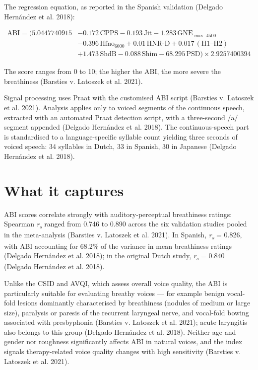 \documentclass[
  english,
  letterpaper,
]{scrbook}
\begin{document}
The regression equation, as reported in the Spanish validation (Delgado
Hernández et al. 2018):

\[
\begin{aligned}
\text{ABI} = \bigl(5.0447740915 &- 0.172\,\text{CPPS} - 0.193\,\text{Jit}
- 1.283\,\text{GNE}_{\max\text{-}4500}\\
&- 0.396\,\text{Hfno}_{6000} + 0.01\,\text{HNR-D} + 0.017\,(\text{H1–H2})\\
&+ 1.473\,\text{ShdB} - 0.088\,\text{Shim}
- 68.295\,\text{PSD}\bigr) \times 2.9257400394
\end{aligned}
\]

The score ranges from 0 to 10; the higher the ABI, the more severe the
breathiness (Barsties v. Latoszek et al. 2021).

Signal processing uses Praat with the customised ABI script (Barsties v.
Latoszek et al. 2021). Analysis applies only to voiced segments of the
continuous speech, extracted with an automated Praat detection script,
with a three-second /a/ segment appended (Delgado Hernández et al.
2018). The continuous-speech part is standardised to a language-specific
syllable count yielding three seconds of voiced speech: 34 syllables in
Dutch, 33 in Spanish, 30 in Japanese (Delgado Hernández et al. 2018).

\section{What it captures}\label{what-it-captures-2}

ABI scores correlate strongly with auditory-perceptual breathiness
ratings: Spearman \emph{r\textsubscript{s}} ranged from 0.746 to 0.890
across the six validation studies pooled in the meta-analysis (Barsties
v. Latoszek et al. 2021). In Spanish, \emph{r\textsubscript{s}} = 0.826,
with ABI accounting for 68.2\% of the variance in mean breathiness
ratings (Delgado Hernández et al. 2018); in the original Dutch study,
\emph{r\textsubscript{s}} = 0.840 (Delgado Hernández et al. 2018).

Unlike the CSID and AVQI, which assess overall voice quality, the ABI is
particularly suitable for evaluating breathy voices --- for example
benign vocal-fold lesions dominantly characterised by breathiness
(nodules of medium or large size), paralysis or paresis of the recurrent
laryngeal nerve, and vocal-fold bowing associated with presbyphonia
(Barsties v. Latoszek et al. 2021); acute laryngitis also belongs to
this group (Delgado Hernández et al. 2018). Neither age and gender nor
roughness significantly affects ABI in natural voices, and the index
signals therapy-related voice quality changes with high sensitivity
(Barsties v. Latoszek et al. 2021).
\end{document}
